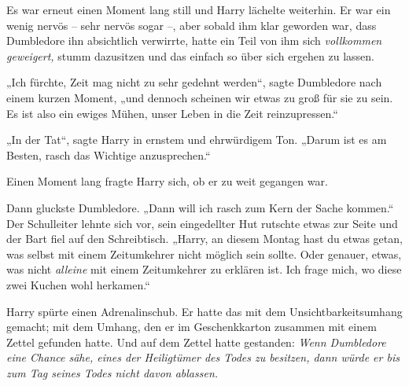 Es war erneut einen Moment lang still und Harry lächelte weiterhin. Er war ein wenig nervös – sehr nervös sogar –, aber sobald ihm klar geworden war, dass Dumbledore ihn absichtlich verwirrte, hatte ein Teil von ihm sich \emph{vollkommen geweigert,} stumm dazusitzen und das einfach so über sich ergehen zu lassen.

„Ich fürchte, Zeit mag nicht zu sehr gedehnt werden“, sagte Dumbledore nach einem kurzen Moment, „und dennoch scheinen wir etwas zu groß für sie zu sein. Es ist also ein ewiges Mühen, unser Leben in die Zeit reinzupressen.“

„In der Tat“, sagte Harry in ernstem und ehrwürdigem Ton. „Darum ist es am Besten, rasch das Wichtige anzusprechen.“

Einen Moment lang fragte Harry sich, ob er zu weit gegangen war.

Dann gluckste Dumbledore. „Dann will ich rasch zum Kern der Sache kommen.“ Der Schulleiter lehnte sich vor, sein eingedellter Hut rutschte etwas zur Seite und der Bart fiel auf den Schreibtisch. „Harry, an diesem Montag hast du etwas getan, was selbst mit einem Zeitumkehrer nicht möglich sein sollte. Oder genauer, etwas, was nicht \emph{alleine} mit einem Zeitumkehrer zu erklären ist. Ich frage mich, wo diese zwei Kuchen wohl herkamen.“

Harry spürte einen Adrenalinschub. Er hatte das mit dem Unsichtbarkeitsumhang gemacht; mit dem Umhang, den er im Geschenkkarton zusammen mit einem Zettel gefunden hatte. Und auf dem Zettel hatte gestanden: \emph{Wenn Dumbledore eine Chance sähe, eines der Heiligtümer des Todes zu besitzen, dann würde er bis zum Tag seines Todes nicht davon ablassen.}

